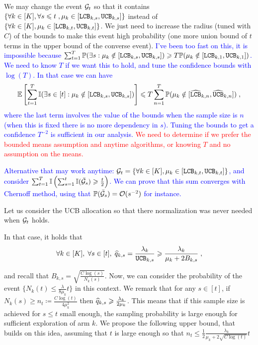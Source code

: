 We may change the event $\mathcal{G}_t$ so that it contains $\{\forall k \in [K],\forall s \leqslant t\;, \mu_k \in [\texttt{LCB}_{k,s}, \texttt{UCB}_{k,s}] \}$ instead of $\{\forall k \in [K], \mu_k \in [\texttt{LCB}_{k,t}, \texttt{UCB}_{k,t}] \}$. We just need to increase the radius (tuned with $C$) of the bounds to make this event high probability (one more union bound of $t$ terms in the upper bound of the converse event).
\textcolor{blue}{I've been too fast on this, it is impossible because $\sum_{t=1}^T \mathbb{P}(\exists s: \mu_k \notin [\texttt{LCB}_{k,s}, \texttt{UCB}_{k,s}])\geqslant T \mathbb{P}(\mu_k \notin [\texttt{LCB}_{k,1}, \texttt{UCB}_{k,1}])$. We need  to know $T$ if we want this to hold, and tune the confidence bounds with $\log(T)$. In that case we can have
\[\mathbb{E}\left[\sum_{t=1}^T \mathbb{I}(\exists s\in [t]: \mu_k \notin [\texttt{LCB}_{k,s}, \texttt{UCB}_{k,s}]) \right] \leqslant T \sum_{n=1}^T \mathbb{P}(\mu_k \notin [\widehat{\texttt{LCB}}_{k,n}, \widehat{\texttt{UCB}}_{k,n}])\;, \]
where the last term involves the value of the bounds when the sample size is $n$ (when this is fixed there is no more dependency in $s$). Tuning the bounds to get a confidence $T^{-2}$ is sufficient in our analysis.
}
\textcolor{red}{We need to determine if we prefer the bounded means assumption and anytime algorithms, or knowing $T$ and no assumption on the means.}

\textcolor{blue}{Alternative that may work anytime: $\mathcal{G}_t=\{\forall k \in [K], \mu_k \in [\texttt{LCB}_{k,t}, \texttt{UCB}_{k,t}] \}$, and consider $\sum_{t=1}^T\mathbb{I}\left(\sum_{s=1}^t \mathbb{I}(\bar {\mathcal{G}}_s) \geqslant \frac{t}{2} \right)$. We can prove that this sum converges with Chernoff method, using that $\mathbb{P}(\bar {\mathcal{G}}_s)=\mathcal{O}(s^{-2})$ for instance.}

Let us consider the UCB allocation so that there normalization was never needed when $\mathcal{G}_t$ holds.

In that case, it holds that \[\forall k \in [K],\;\forall s \in [t],\; \widehat{q}_{k,s} = \frac{\lambda_k}{\texttt{UCB}_{k,s}} \geqslant \frac{\lambda_k}{\mu_k + 2 B_{k, s}} \;, \]

and recall that $B_{k,s}=\sqrt{\frac{C\log(s)}{N_k(s)}}$. Now, we can consider the probability of the event $\{N_k(t)\leq \frac{\lambda}{8\mu_k}t \}$ in this context. We remark that for any $s\in [t]$, if $N_k(s) \geq n_t \coloneqq \frac{C\log(t)}{4\mu_k^2}$ then $\widehat{q}_{k,s}\geqslant \frac{\lambda_k}{2\mu_k}$. This means that if this sample size is achieved for $s\leq t$ small enough, the sampling probability is large enough for sufficient exploration of arm $k$. We propose the following upper bound, that builds on this idea, assuming that $t$ is large enough so that $n_t\leq  \frac{1}{2}\frac{\lambda_k}{\mu_k + 2\sqrt{C\log(t)}}t$

